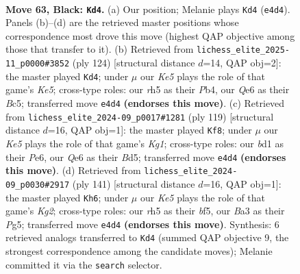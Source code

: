\documentclass[11pt]{article}
\begin{document}
\clearpage

\begin{figure}[p]\centering
\begin{subfigure}{0.46\textwidth}\centering
\resizebox{\linewidth}{!}{%
\newchessgame
\chessboard[
  setfen={8/8/4q3/7R/1p2k3/b7/6K1/3B4 b - - 17 63},
  showmover=false,
  pgfstyle=straightmove, color=movearrow, markmove={e4-d4}
]}
\caption{}
\end{subfigure}\hfill
\begin{subfigure}{0.46\textwidth}\centering
\resizebox{\linewidth}{!}{%
\newchessgame
\chessboard[
  setfen={8/3k2P1/8/2B1K3/1P6/1b6/8/8 w - - 13 63},
  showmover=false,
  pgfstyle=straightmove, color=movearrow, markmove={e5-d4}
]}
\caption{}
\end{subfigure}
\\[4pt]
\begin{subfigure}{0.46\textwidth}\centering
\resizebox{\linewidth}{!}{%
\newchessgame
\chessboard[
  setfen={6k1/8/4p3/3b4/8/4K3/1B6/8 b - - 16 60},
  showmover=false,
  pgfstyle=straightmove, color=movearrow, markmove={g8-f8}
]}
\caption{}
\end{subfigure}\hfill
\begin{subfigure}{0.46\textwidth}\centering
\resizebox{\linewidth}{!}{%
\newchessgame
\chessboard[
  setfen={8/1K4k1/8/5Bp1/7b/7P/8/8 b - - 27 71},
  showmover=false,
  pgfstyle=straightmove, color=movearrow, markmove={g7-h6}
]}
\caption{}
\end{subfigure}
\caption{\textbf{Move 63, Black: \texttt{Kd4}.} (a) Our position; Melanie plays \texttt{Kd4} (\texttt{e4d4}). Panels (b)--(d) are the retrieved master positions whose correspondence most drove this move (highest QAP objective among those that transfer to it). (b) Retrieved from \texttt{lichess\_elite\_2025-11\_p0000\#3852} (ply 124) [structural distance $d$=14, QAP obj=2]: the master played \texttt{Kd4}; under $\mu$ our \emph{Ke5} plays the role of that game's \emph{Ke5}; cross-type roles: our \emph{r}h5 as their \emph{P}b4, our \emph{Q}e6 as their \emph{B}c5; transferred move \texttt{e4d4} \textbf{(endorses this move)}. (c) Retrieved from \texttt{lichess\_elite\_2024-09\_p0017\#1281} (ply 119) [structural distance $d$=16, QAP obj=1]: the master played \texttt{Kf8}; under $\mu$ our \emph{Ke5} plays the role of that game's \emph{Kg1}; cross-type roles: our \emph{b}d1 as their \emph{P}e6, our \emph{Q}e6 as their \emph{B}d5; transferred move \texttt{e4d4} \textbf{(endorses this move)}. (d) Retrieved from \texttt{lichess\_elite\_2024-09\_p0030\#2917} (ply 141) [structural distance $d$=16, QAP obj=1]: the master played \texttt{Kh6}; under $\mu$ our \emph{Ke5} plays the role of that game's \emph{Kg2}; cross-type roles: our \emph{r}h5 as their \emph{b}f5, our \emph{B}a3 as their \emph{P}g5; transferred move \texttt{e4d4} \textbf{(endorses this move)}. Synthesis: 6 retrieved analogs transferred to \texttt{Kd4} (summed QAP objective 9, the strongest correspondence among the candidate moves); Melanie committed it via the \texttt{search} selector.}
\label{fig:thought-m125}
\end{figure}
\end{document}
